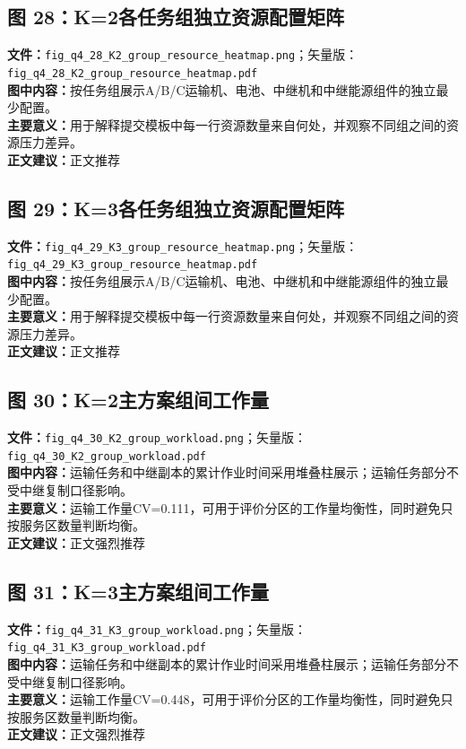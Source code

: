 \subsection*{图 28：K=2各任务组独立资源配置矩阵}
\textbf{文件：}\texttt{fig\_q4\_28\_K2\_group\_resource\_heatmap.png}；矢量版：\texttt{fig\_q4\_28\_K2\_group\_resource\_heatmap.pdf}\\
\textbf{图中内容：}按任务组展示A/B/C运输机、电池、中继机和中继能源组件的独立最少配置。\\
\textbf{主要意义：}用于解释提交模板中每一行资源数量来自何处，并观察不同组之间的资源压力差异。\\
\textbf{正文建议：}正文推荐

\subsection*{图 29：K=3各任务组独立资源配置矩阵}
\textbf{文件：}\texttt{fig\_q4\_29\_K3\_group\_resource\_heatmap.png}；矢量版：\texttt{fig\_q4\_29\_K3\_group\_resource\_heatmap.pdf}\\
\textbf{图中内容：}按任务组展示A/B/C运输机、电池、中继机和中继能源组件的独立最少配置。\\
\textbf{主要意义：}用于解释提交模板中每一行资源数量来自何处，并观察不同组之间的资源压力差异。\\
\textbf{正文建议：}正文推荐

\subsection*{图 30：K=2主方案组间工作量}
\textbf{文件：}\texttt{fig\_q4\_30\_K2\_group\_workload.png}；矢量版：\texttt{fig\_q4\_30\_K2\_group\_workload.pdf}\\
\textbf{图中内容：}运输任务和中继副本的累计作业时间采用堆叠柱展示；运输任务部分不受中继复制口径影响。\\
\textbf{主要意义：}运输工作量CV=0.111，可用于评价分区的工作量均衡性，同时避免只按服务区数量判断均衡。\\
\textbf{正文建议：}正文强烈推荐

\subsection*{图 31：K=3主方案组间工作量}
\textbf{文件：}\texttt{fig\_q4\_31\_K3\_group\_workload.png}；矢量版：\texttt{fig\_q4\_31\_K3\_group\_workload.pdf}\\
\textbf{图中内容：}运输任务和中继副本的累计作业时间采用堆叠柱展示；运输任务部分不受中继复制口径影响。\\
\textbf{主要意义：}运输工作量CV=0.448，可用于评价分区的工作量均衡性，同时避免只按服务区数量判断均衡。\\
\textbf{正文建议：}正文强烈推荐


